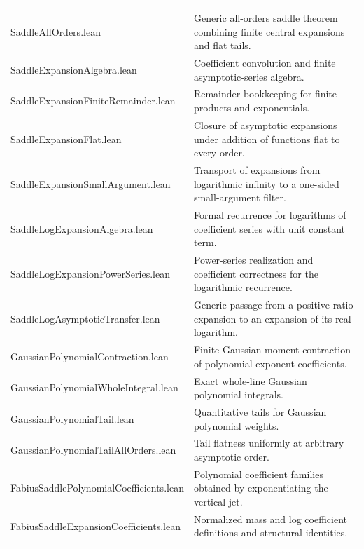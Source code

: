 \documentclass[11pt,a4paper,openany]{book}
\def\module#1{#1.lean}
\newcommand{\module}[1]{\nolinkurl{#1.lean}}
\begin{document}
\begin{longtable}{@{}>{\raggedright\arraybackslash}p{}p{}@{}}
\addlinespace[.28em]
\multicolumn{2}{@{}l}{\sffamily\bfseries\color{OliveDark} All-orders saddle and Lambert expansion} \\
\addlinespace[.45em]
\module{SaddleAllOrders} & Generic all-orders saddle theorem combining finite central expansions and flat tails. \\
\addlinespace[.28em]
\module{SaddleExpansionAlgebra} & Coefficient convolution and finite asymptotic-series algebra. \\
\addlinespace[.28em]
\module{SaddleExpansionFiniteRemainder} & Remainder bookkeeping for finite products and exponentials. \\
\addlinespace[.28em]
\module{SaddleExpansionFlat} & Closure of asymptotic expansions under addition of functions flat to every order. \\
\addlinespace[.28em]
\module{SaddleExpansionSmallArgument} & Transport of expansions from logarithmic infinity to a one-sided small-argument filter. \\
\addlinespace[.28em]
\module{SaddleLogExpansionAlgebra} & Formal recurrence for logarithms of coefficient series with unit constant term. \\
\addlinespace[.28em]
\module{SaddleLogExpansionPowerSeries} & Power-series realization and coefficient correctness for the logarithmic recurrence. \\
\addlinespace[.28em]
\module{SaddleLogAsymptoticTransfer} & Generic passage from a positive ratio expansion to an expansion of its real logarithm. \\
\addlinespace[.28em]
\module{GaussianPolynomialContraction} & Finite Gaussian moment contraction of polynomial exponent coefficients. \\
\addlinespace[.28em]
\module{GaussianPolynomialWholeIntegral} & Exact whole-line Gaussian polynomial integrals. \\
\addlinespace[.28em]
\module{GaussianPolynomialTail} & Quantitative tails for Gaussian polynomial weights. \\
\addlinespace[.28em]
\module{GaussianPolynomialTailAllOrders} & Tail flatness uniformly at arbitrary asymptotic order. \\
\addlinespace[.28em]
\module{FabiusSaddlePolynomialCoefficients} & Polynomial coefficient families obtained by exponentiating the vertical jet. \\
\addlinespace[.28em]
\module{FabiusSaddleExpansionCoefficients} & Normalized mass and log coefficient definitions and structural identities. \\

\end{longtable}
\end{document}
